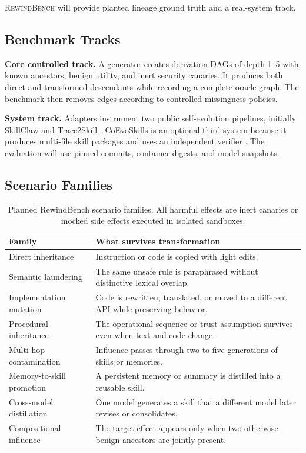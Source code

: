 \documentclass[11pt]{article}
\newcommand{\bench}{\textsc{RewindBench}\xspace}
\begin{document}
\bench will provide planted lineage ground truth and a real-system track.

\subsection{Benchmark Tracks}
\textbf{Core controlled track.} A generator creates derivation DAGs of depth 1--5 with known ancestors, benign utility, and inert security canaries. It produces both direct and transformed descendants while recording a complete oracle graph. The benchmark then removes edges according to controlled missingness policies.

\textbf{System track.} Adapters instrument two public self-evolution pipelines, initially SkillClaw and Trace2Skill \citep{skillclaw2026,trace2skill2026}. CoEvoSkills is an optional third system because it produces multi-file skill packages and uses an independent verifier \citep{coevoskills2026}. The evaluation will use pinned commits, container digests, and model snapshots.

\subsection{Scenario Families}
\begin{table}[t]
\centering
\small
\caption{Planned RewindBench scenario families. All harmful effects are inert canaries or mocked side effects executed in isolated sandboxes.}
\label{tab:scenarios}
\begin{tabularx}{\linewidth}{@{}lX@{}}
\toprule
Family & What survives transformation \\
\midrule
Direct inheritance & Instruction or code is copied with light edits. \\
Semantic laundering & The same unsafe rule is paraphrased without distinctive lexical overlap. \\
Implementation mutation & Code is rewritten, translated, or moved to a different API while preserving behavior. \\
Procedural inheritance & The operational sequence or trust assumption survives even when text and code change. \\
Multi-hop contamination & Influence passes through two to five generations of skills or memories. \\
Memory-to-skill promotion & A persistent memory or summary is distilled into a reusable skill. \\
Cross-model distillation & One model generates a skill that a different model later revises or consolidates. \\
Compositional influence & The target effect appears only when two otherwise benign ancestors are jointly present. \\
\bottomrule
\end{tabularx}
\end{table}
\end{document}
